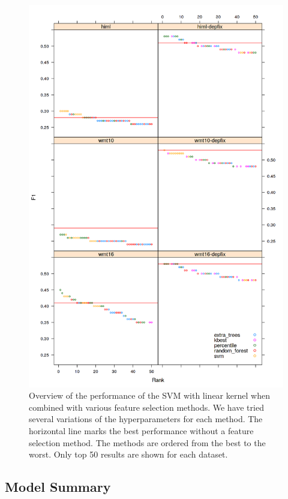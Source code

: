 \begin{figure}
\centering
  \includegraphics[scale=0.7]{wf-sel}
  \caption[Feature selection method comparison - Error detection]{
    Overview of the performance of the SVM with linear kernel when combined with various feature selection methods.
We have tried several variations of the hyperparameters
for each method. The horizontal line marks the best performance without
a feature selection method. The methods are ordered from the best to the worst. Only top 50 results
are shown for each dataset.
}
  \label{wf-sel}
\end{figure}


\subsection{Model Summary}

